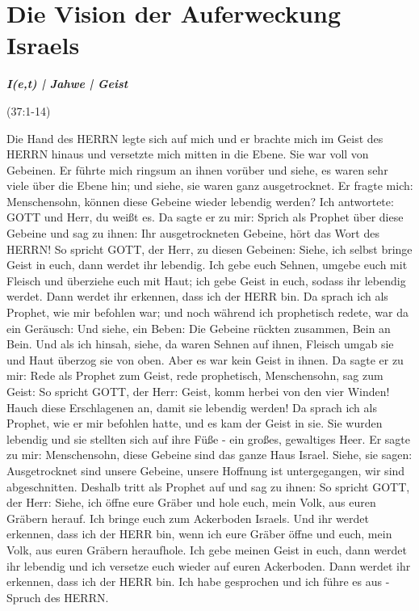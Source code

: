 \newpage
\section{Die Vision der Auferweckung Israels}

\textbf{\textit{I(e,t) | Jahwe | Geist}}

(37:1-14)
\begin{BibelSt}
Die Hand des HERRN legte sich auf mich und er brachte mich im Geist des HERRN hinaus und versetzte mich mitten in die Ebene. Sie war voll von Gebeinen. Er führte mich ringsum an ihnen vorüber und siehe, es waren sehr viele über die Ebene hin; und siehe, sie waren ganz ausgetrocknet. Er fragte mich: Menschensohn, können diese Gebeine wieder lebendig werden? Ich antwortete: GOTT und Herr, du weißt es. Da sagte er zu mir: Sprich als Prophet über diese Gebeine und sag zu ihnen: Ihr ausgetrockneten Gebeine, hört das Wort des HERRN! So spricht GOTT, der Herr, zu diesen Gebeinen: Siehe, ich selbst bringe Geist in euch, dann werdet ihr lebendig. Ich gebe euch Sehnen, umgebe euch mit Fleisch und überziehe euch mit Haut; ich gebe Geist in euch, sodass ihr lebendig werdet. Dann werdet ihr erkennen, dass ich der HERR bin. Da sprach ich als Prophet, wie mir befohlen war; und noch während ich prophetisch redete, war da ein Geräusch: Und siehe, ein Beben: Die Gebeine rückten zusammen, Bein an Bein. Und als ich hinsah, siehe, da waren Sehnen auf ihnen, Fleisch umgab sie und Haut überzog sie von oben. Aber es war kein Geist in ihnen. Da sagte er zu mir: Rede als Prophet zum Geist, rede prophetisch, Menschensohn, sag zum Geist: So spricht GOTT, der Herr: Geist, komm herbei von den vier Winden! Hauch diese Erschlagenen an, damit sie lebendig werden! Da sprach ich als Prophet, wie er mir befohlen hatte, und es kam der Geist in sie. Sie wurden lebendig und sie stellten sich auf ihre Füße - ein großes, gewaltiges Heer.
Er sagte zu mir: Menschensohn, diese Gebeine sind das ganze Haus Israel. Siehe, sie sagen: Ausgetrocknet sind unsere Gebeine, unsere Hoffnung ist untergegangen, wir sind abgeschnitten. Deshalb tritt als Prophet auf und sag zu ihnen: So spricht GOTT, der Herr: Siehe, ich öffne eure Gräber und hole euch, mein Volk, aus euren Gräbern herauf. Ich bringe euch zum Ackerboden Israels. Und ihr werdet erkennen, dass ich der HERR bin, wenn ich eure Gräber öffne und euch, mein Volk, aus euren Gräbern heraufhole. Ich gebe meinen Geist in euch, dann werdet ihr lebendig und ich versetze euch wieder auf euren Ackerboden. Dann werdet ihr erkennen, dass ich der HERR bin. Ich habe gesprochen und ich führe es aus - Spruch des HERRN.
\end{BibelSt}

